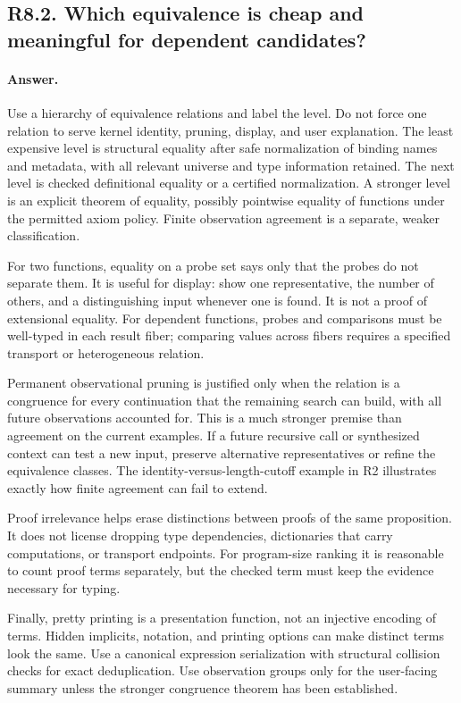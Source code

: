 \documentclass[11pt,a4paper]{article}
\newcommand{\answer}{\paragraph{Answer.}}
\theoremstyle{definition}
\theoremstyle{remark}
\begin{document}
\subsection{R8.2. Which equivalence is cheap and meaningful for dependent candidates?}
\answer Use a hierarchy of equivalence relations and label the level. Do not force
one relation to serve kernel identity, pruning, display, and user explanation.
The least expensive level is structural equality after safe normalization of
binding names and metadata, with all relevant universe and type information
retained. The next level is checked definitional equality or a certified
normalization. A stronger level is an explicit theorem of equality, possibly
pointwise equality of functions under the permitted axiom policy. Finite
observation agreement is a separate, weaker classification.

For two functions, equality on a probe set says only that the probes do not
separate them. It is useful for display: show one representative, the number of
others, and a distinguishing input whenever one is found. It is not a proof of
extensional equality. For dependent functions, probes and comparisons must be
well-typed in each result fiber; comparing values across fibers requires a
specified transport or heterogeneous relation.

Permanent observational pruning is justified only when the relation is a
congruence for every continuation that the remaining search can build, with
all future observations accounted for. This is a much stronger premise than
agreement on the current examples. If a future recursive call or synthesized
context can test a new input, preserve alternative representatives or refine
the equivalence classes. The identity-versus-length-cutoff example in R2
illustrates exactly how finite agreement can fail to extend.

Proof irrelevance helps erase distinctions between proofs of the same
proposition. It does not license dropping type dependencies, dictionaries that
carry computations, or transport endpoints. For program-size ranking it is
reasonable to count proof terms separately, but the checked term must keep the
evidence necessary for typing.

Finally, pretty printing is a presentation function, not an injective encoding
of terms. Hidden implicits, notation, and printing options can make distinct
terms look the same. Use a canonical expression serialization with structural
collision checks for exact deduplication. Use observation groups only for the
user-facing summary unless the stronger congruence theorem has been established.
\end{document}
